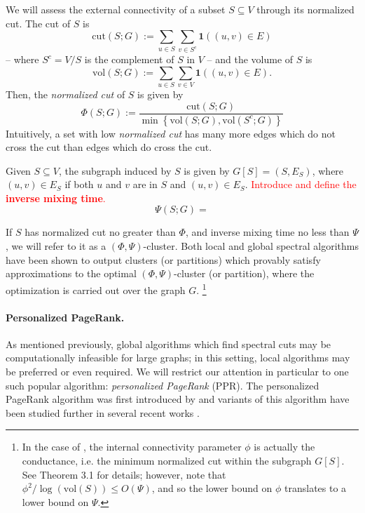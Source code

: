 \documentclass{article}
\newcommand{\vol}{\text{vol}}
\newcommand{\cut}{\mathrm{cut}}
\newcommand{\1}{\mathbf{1}}
\theoremstyle{aldenthm}
\theoremstyle{remark}
\begin{document}
We will assess the external connectivity of a subset $S \subseteq V$ through its normalized cut. The cut of $S$ is
\begin{equation*}
\cut(S; G) := \sum_{u \in S} \sum_{v \in S^c} \1\left((u,v) \in E \right)
\end{equation*}
-- where $S^c = V / S$ is the complement of $S$ in $V$ -- and the volume of $S$ is
\begin{equation*}
\vol(S; G) := \sum_{u \in S} \sum_{v \in V} \1\left((u,v) \in E \right).
\end{equation*}
Then, the \textit{normalized cut} of $S$ is given by
\begin{equation}
\label{eqn: norm_cut}
\Phi(S; G) := \frac{\cut(S; G)}{ \min\left\{\vol(S; G), \vol(S^c; G) \right\} }
\end{equation} 
Intuitively, a set with low \textit{normalized cut} has many more edges which do not cross the cut than edges which do cross the cut. 

Given $S \subseteq V$, the subgraph induced by $S$ is given by $G[S] = (S, E_S)$, where $(u,v) \in E_S$ if both $u$ and $v$ are in $S$ and $(u,v) \in E_S$. \textcolor{red}{Introduce and define the \textbf{inverse mixing time}.} 
\begin{equation}
\label{eqn: inv_mixing_time}
\Psi(S; G) = 
\end{equation}

If $S$ has normalized cut no greater than $\Phi$, and inverse mixing time no less than $\Psi$, we will refer to it as a $(\Phi,\Psi)$-cluster. Both local \cite{zhu2013} and global \cite{kannan04} spectral algorithms have been shown to output clusters (or partitions) which provably satisfy approximations to the optimal $(\Phi, \Psi)$-cluster (or partition), where the optimization is carried out over the graph $G$. \footnote{In the case of \cite{kannan04}, the internal connectivity parameter $\phi$ is actually the conductance, i.e. the minimum normalized cut within the subgraph $G[S]$. See Theorem 3.1 for details; however, note that $\phi^2 / \log(\vol(S)) \leq O(\Psi)$, and so the lower bound on $\phi$ translates to a lower bound on $\Psi$.}

\paragraph{Personalized PageRank.}
As mentioned previously, global algorithms which find spectral cuts may be computationally infeasible for large graphs; in this setting, local algorithms may be preferred or even required. We will restrict our attention in particular to one such popular algorithm: \textit{personalized PageRank} (PPR). The personalized PageRank algorithm was first introduced by \cite{haveliwala2003} and variants of this algorithm have been studied further in several recent works \citep{spielman2011,spielman2014,zhu2013,anderson2006,mahoney2012}. 
\end{document}
